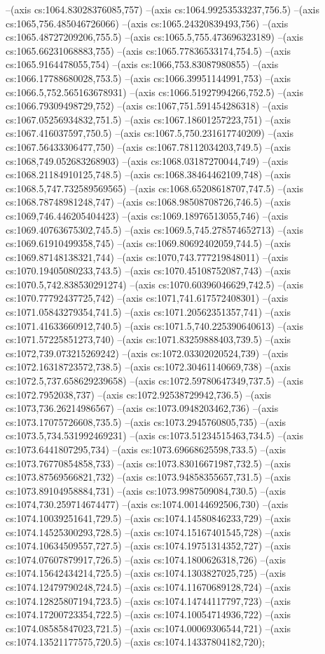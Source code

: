 --(axis cs:1064.83028376085,757)
--(axis cs:1064.99253533237,756.5)
--(axis cs:1065,756.485046726066)
--(axis cs:1065.24320839493,756)
--(axis cs:1065.48727209206,755.5)
--(axis cs:1065.5,755.473696323189)
--(axis cs:1065.66231068883,755)
--(axis cs:1065.77836533174,754.5)
--(axis cs:1065.9164478055,754)
--(axis cs:1066,753.83087980855)
--(axis cs:1066.17788680028,753.5)
--(axis cs:1066.39951144991,753)
--(axis cs:1066.5,752.565163678931)
--(axis cs:1066.51927994266,752.5)
--(axis cs:1066.79309498729,752)
--(axis cs:1067,751.591454286318)
--(axis cs:1067.05256934832,751.5)
--(axis cs:1067.18601257223,751)
--(axis cs:1067.416037597,750.5)
--(axis cs:1067.5,750.231617740209)
--(axis cs:1067.56433306477,750)
--(axis cs:1067.78112034203,749.5)
--(axis cs:1068,749.052683268903)
--(axis cs:1068.03187270044,749)
--(axis cs:1068.21184910125,748.5)
--(axis cs:1068.38464462109,748)
--(axis cs:1068.5,747.732589569565)
--(axis cs:1068.65208618707,747.5)
--(axis cs:1068.78748981248,747)
--(axis cs:1068.98508708726,746.5)
--(axis cs:1069,746.446205404423)
--(axis cs:1069.18976513055,746)
--(axis cs:1069.40763675302,745.5)
--(axis cs:1069.5,745.278574652713)
--(axis cs:1069.61910499358,745)
--(axis cs:1069.80692402059,744.5)
--(axis cs:1069.87148138321,744)
--(axis cs:1070,743.777219848011)
--(axis cs:1070.19405080233,743.5)
--(axis cs:1070.45108752087,743)
--(axis cs:1070.5,742.838530291274)
--(axis cs:1070.60396046629,742.5)
--(axis cs:1070.77792437725,742)
--(axis cs:1071,741.617572408301)
--(axis cs:1071.05843279354,741.5)
--(axis cs:1071.20562351357,741)
--(axis cs:1071.41633660912,740.5)
--(axis cs:1071.5,740.225390640613)
--(axis cs:1071.57225851273,740)
--(axis cs:1071.83259888403,739.5)
--(axis cs:1072,739.073215269242)
--(axis cs:1072.03302020524,739)
--(axis cs:1072.16318723572,738.5)
--(axis cs:1072.30461140669,738)
--(axis cs:1072.5,737.658629239658)
--(axis cs:1072.59780647349,737.5)
--(axis cs:1072.7952038,737)
--(axis cs:1072.92538729942,736.5)
--(axis cs:1073,736.26214986567)
--(axis cs:1073.0948203462,736)
--(axis cs:1073.17075726608,735.5)
--(axis cs:1073.2945760805,735)
--(axis cs:1073.5,734.531992469231)
--(axis cs:1073.51234515463,734.5)
--(axis cs:1073.6441807295,734)
--(axis cs:1073.69668625598,733.5)
--(axis cs:1073.76770854858,733)
--(axis cs:1073.83016671987,732.5)
--(axis cs:1073.87569566821,732)
--(axis cs:1073.94858355657,731.5)
--(axis cs:1073.89104958884,731)
--(axis cs:1073.9987509084,730.5)
--(axis cs:1074,730.259714674477)
--(axis cs:1074.00144692506,730)
--(axis cs:1074.10039251641,729.5)
--(axis cs:1074.14580846233,729)
--(axis cs:1074.14525300293,728.5)
--(axis cs:1074.15167401545,728)
--(axis cs:1074.10634509557,727.5)
--(axis cs:1074.19751314352,727)
--(axis cs:1074.07607879917,726.5)
--(axis cs:1074.1800626318,726)
--(axis cs:1074.15642434214,725.5)
--(axis cs:1074.1303827025,725)
--(axis cs:1074.12479790248,724.5)
--(axis cs:1074.11670689128,724)
--(axis cs:1074.12825807194,723.5)
--(axis cs:1074.14744117797,723)
--(axis cs:1074.17200723354,722.5)
--(axis cs:1074.10054714936,722)
--(axis cs:1074.08585847023,721.5)
--(axis cs:1074.00069306544,721)
--(axis cs:1074.13521177575,720.5)
--(axis cs:1074.14337804182,720);

